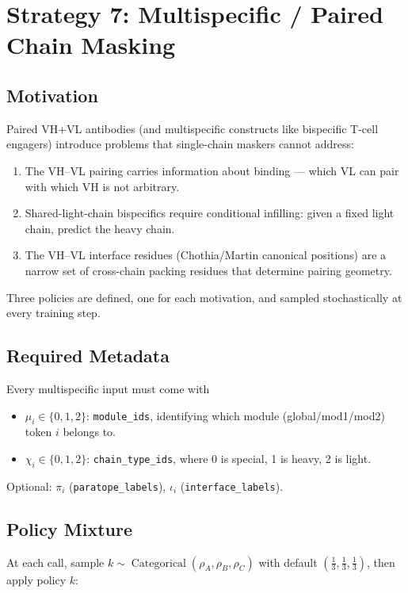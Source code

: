 \documentclass[11pt]{article}
\DeclareMathOperator{\Cat}{Categorical}
\begin{document}
\section{Strategy 7: Multispecific / Paired Chain Masking}

\subsection{Motivation}
Paired VH+VL antibodies (and multispecific constructs like bispecific
T-cell engagers) introduce problems that single-chain maskers cannot
address:
\begin{enumerate}
\item The VH--VL pairing carries information about binding --- which VL
can pair with which VH is not arbitrary.
\item Shared-light-chain bispecifics require conditional infilling:
given a fixed light chain, predict the heavy chain.
\item The VH--VL interface residues (Chothia/Martin canonical positions)
are a narrow set of cross-chain packing residues that determine
pairing geometry.
\end{enumerate}
Three policies are defined, one for each motivation, and sampled
stochastically at every training step.

\subsection{Required Metadata}
Every multispecific input must come with
\begin{itemize}[nosep]
\item $\mu_i \in \{0, 1, 2\}$: \texttt{module\_ids}, identifying which
module (global/mod1/mod2) token $i$ belongs to.
\item $\chi_i \in \{0, 1, 2\}$: \texttt{chain\_type\_ids}, where 0 is
special, 1 is heavy, 2 is light.
\end{itemize}
Optional: $\pi_i$ (\texttt{paratope\_labels}), $\iota_i$
(\texttt{interface\_labels}).

\subsection{Policy Mixture}
At each call, sample $k \sim \Cat(\rho_A, \rho_B, \rho_C)$ with
default $(\tfrac13, \tfrac13, \tfrac13)$, then apply policy $k$:
\end{document}
